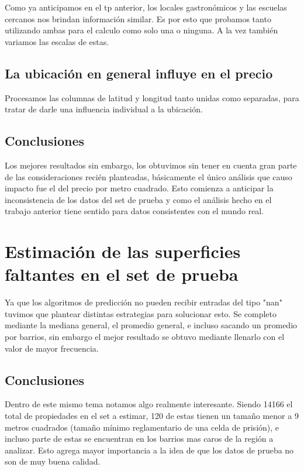 \documentclass[a4paper, 10pt]{article}
\begin{document}
		Como ya anticipamos en el tp anterior, los locales gastronómicos y las escuelas cercanos nos brindan información similar. Es por esto que probamos tanto utilizando ambas para el calculo como solo una o ninguna. A la vez también variamos las escalas de estas. 
			
		\subsection{La ubicación en general influye en el precio}
		Procesamos las columnas de latitud y longitud tanto unidas como separadas, para tratar de darle una influencia individual a la ubicación.
		
		\subsection{Conclusiones}
		Los mejores resultados sin embargo, los obtuvimos sin tener en cuenta gran parte de las consideraciones recién planteadas, básicamente el único análisis que causo impacto fue el del precio por metro cuadrado. Esto comienza a anticipar la inconsistencia de los datos del set de prueba y como el análisis hecho en el trabajo anterior tiene sentido para datos consistentes con el mundo real. 		
		
		
	\section{Estimación de las superficies faltantes en el set de prueba}
		Ya que los algoritmos de predicción no pueden recibir entradas del tipo "nan" tuvimos que plantear distintas estrategias para solucionar esto. Se completo mediante la mediana general, el promedio general, e incluso sacando un promedio por barrios, sin embargo el mejor resultado se obtuvo mediante llenarlo con el valor de mayor frecuencia.
		
		\subsection{Conclusiones}
		Dentro de este mismo tema notamos algo realmente interesante. Siendo 14166 el total de propiedades en el set a estimar, 120 de estas tienen un tamaño menor a 9 metros cuadrados (tamaño mínimo reglamentario de una celda de prisión), e incluso parte de estas se encuentran en los barrios mas caros de la región a analizar. Esto agrega mayor importancia a la idea de que los datos de prueba no son de muy buena calidad. 
	
\end{document}
